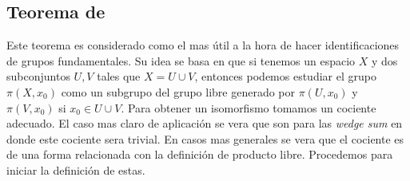 \subsection{Teorema de \vank}
Este teorema es considerado como el mas útil a la hora de hacer
identificaciones de grupos fundamentales. Su idea se basa en que si
tenemos un espacio \(X\) y dos subconjuntos \(U,V\) tales que \(X = U
\cup V\), entonces podemos estudiar el grupo \(\pi (X, x_0)\) como un
subgrupo del grupo libre generado por \(\pi (U, x_0)\) y \(\pi (V,
x_0)\) si \(x_0 \in U \cup V\). Para obtener un isomorfismo tomamos un
cociente adecuado. El caso mas claro de aplicación se vera que son para
las \emph{wedge sum} en donde este cociente sera trivial. En casos mas
generales se vera que el cociente es de una forma relacionada con la
definición de producto libre. Procedemos para iniciar la definición de
estas.

